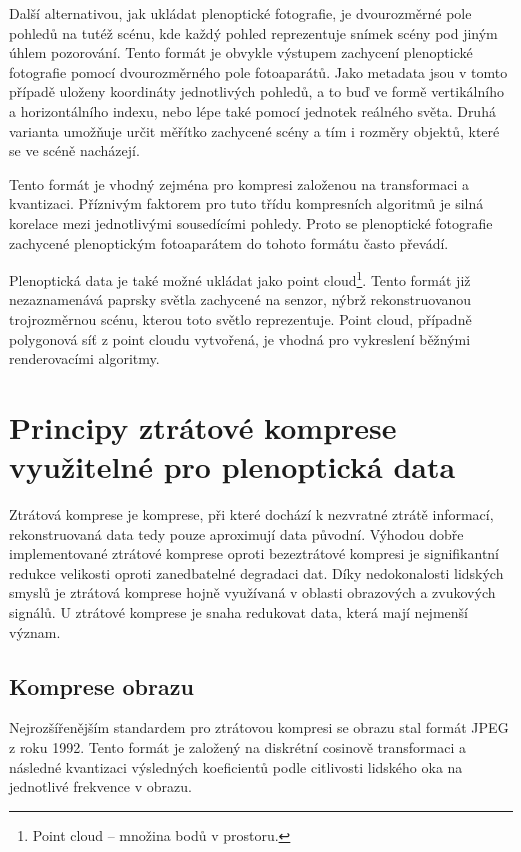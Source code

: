Další alternativou, jak ukládat plenoptické fotografie, je dvourozměrné pole pohledů na tutéž scénu, kde každý pohled reprezentuje snímek scény pod jiným úhlem pozorování.
Tento formát je obvykle výstupem zachycení plenoptické fotografie pomocí dvourozměrného pole fotoaparátů.
Jako metadata jsou v tomto případě uloženy koordináty jednotlivých pohledů, a to buď ve formě vertikálního a horizontálního indexu, nebo lépe také pomocí jednotek reálného světa.
Druhá varianta umožňuje určit měřítko zachycené scény a tím i rozměry objektů, které se ve scéně nacházejí.

Tento formát je vhodný zejména pro kompresi založenou na transformaci a kvantizaci.
Příznivým faktorem pro tuto třídu kompresních algoritmů je silná korelace mezi jednotlivými sousedícími pohledy.
Proto se plenoptické fotografie zachycené plenoptickým fotoaparátem do tohoto formátu často převádí.

Plenoptická data je také možné ukládat jako point cloud\footnote{Point cloud -- množina bodů v prostoru.}.
Tento formát již nezaznamenává paprsky světla zachycené na senzor, nýbrž rekonstruovanou trojrozměrnou scénu, kterou toto světlo reprezentuje.
Point cloud, případně polygonová síť z point cloudu vytvořená, je vhodná pro vykreslení běžnými renderovacími algoritmy.



\chapter{Principy ztrátové komprese využitelné pro plenoptická data}
\label{kompres-teo}
Ztrátová komprese je komprese, při které dochází k nezvratné ztrátě informací, rekonstruovaná data tedy pouze aproximují data původní.
Výhodou dobře implementované ztrátové komprese oproti bezeztrátové kompresi je signifikantní redukce velikosti oproti zanedbatelné degradaci dat.
Díky nedokonalosti lidských smyslů je ztrátová komprese hojně využívaná v oblasti obrazových a zvukových signálů.
U ztrátové komprese je snaha redukovat data, která mají nejmenší význam.

\section{Komprese obrazu}
Nejrozšířenějším standardem pro ztrátovou kompresi se obrazu stal formát JPEG z roku 1992.
Tento formát je založený na diskrétní cosinově transformaci a následné kvantizaci výsledných koeficientů podle citlivosti lidského oka na jednotlivé frekvence v obrazu.

